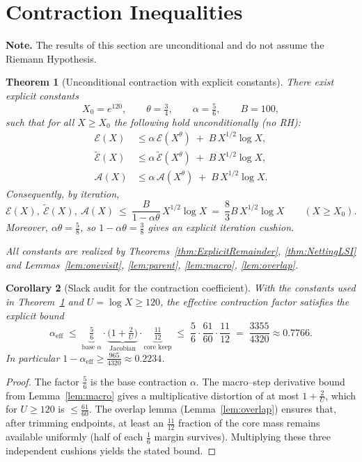 \documentclass[11pt]{article}
\theoremstyle{plain}
\newtheorem{theorem}{Theorem}[section]
\newtheorem{corollary}[theorem]{Corollary}
\theoremstyle{definition}
\theoremstyle{remark}
\begin{document}
\section{Contraction Inequalities}\label{sec:contraction}

\noindent\textbf{Note.} The results of this section are unconditional and do not assume the Riemann Hypothesis.

\begin{theorem}[Unconditional contraction with explicit constants]\label{thm:MainContraction}
There exist explicit constants
\[
X_0=e^{120},\qquad \theta=\tfrac34,\qquad \alpha=\tfrac56,\qquad B=100,
\]
such that for all $X\ge X_0$ the following hold unconditionally (no RH):
\begin{align*}
\mathcal E(X) &\le \alpha\,\mathcal E(X^{\theta}) \;+\; B\,X^{1/2}\log X,\\
\widetilde{\mathcal E}(X) &\le \alpha\,\widetilde{\mathcal E}(X^{\theta}) \;+\; B\,X^{1/2}\log X,\\
\mathcal A(X) &\le \alpha\,\mathcal A(X^{\theta}) \;+\; B\,X^{1/2}\log X.
\end{align*}
Consequently, by iteration,
\[
\mathcal E(X),\ \widetilde{\mathcal E}(X),\ \mathcal A(X)\ \le\ \frac{B}{1-\alpha\theta}\,X^{1/2}\log X
\ =\ \frac{8}{3}B\,X^{1/2}\log X\qquad (X\ge X_0).
\]
Moreover, $\alpha\theta=\tfrac{5}{8}$, so $1-\alpha\theta=\tfrac{3}{8}$ gives an explicit iteration cushion.

All constants are realized by Theorems~\ref{thm:ExplicitRemainder}, \ref{thm:NettingLSI} and Lemmas~\ref{lem:onevisit}, \ref{lem:parent}, \ref{lem:macro}, \ref{lem:overlap}.
\end{theorem}

\begin{corollary}[Slack audit for the contraction coefficient]\label{cor:slack}
With the constants used in Theorem~\ref{thm:MainContraction} and $U=\log X\ge120$, the
\emph{effective} contraction factor satisfies the explicit bound
\[
\alpha_{\mathrm{eff}}
\;\le\;
\underbrace{\tfrac{5}{6}}_{\text{base }\alpha}\cdot
\underbrace{\Big(1+\tfrac{2}{U}\Big)}_{\text{Jacobian}}\cdot
\underbrace{\tfrac{11}{12}}_{\text{core keep}}
\;\le\;
\frac{5}{6}\cdot\frac{61}{60}\cdot\frac{11}{12}
\;=\;
\frac{3355}{4320}
\approx 0.7766.
\]
In particular $1-\alpha_{\mathrm{eff}}\ge \tfrac{965}{4320}\approx 0.2234$.
\end{corollary}

\begin{proof}
The factor $\tfrac{5}{6}$ is the base contraction $\alpha$. The macro--step derivative bound
from Lemma~\ref{lem:macro} gives a multiplicative distortion of at most $1+\frac{2}{U}$,
which for $U\ge120$ is $\le \frac{61}{60}$. The overlap lemma (Lemma~\ref{lem:overlap}) ensures
that, after trimming endpoints, at least an $\frac{11}{12}$ fraction of the core mass remains
available uniformly (half of each $\frac{1}{6}$ margin survives). Multiplying these three
independent cushions yields the stated bound.
\end{proof}
\end{document}
